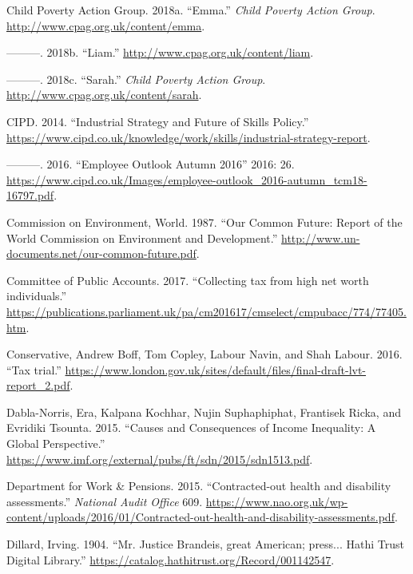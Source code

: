 \documentclass[]{tufte-handout}
\begin{document}
\leavevmode\hypertarget{ref-ChildPovertyActionGroupb}{}%
Child Poverty Action Group. 2018a. ``Emma.'' \emph{Child Poverty Action
Group}. \url{http://www.cpag.org.uk/content/emma}.

\leavevmode\hypertarget{ref-ChildPovertyActionGroupa}{}%
---------. 2018b. ``Liam.'' \url{http://www.cpag.org.uk/content/liam}.

\leavevmode\hypertarget{ref-ChildPovertyActionGroup}{}%
---------. 2018c. ``Sarah.'' \emph{Child Poverty Action Group}.
\url{http://www.cpag.org.uk/content/sarah}.

\leavevmode\hypertarget{ref-CIPD2014}{}%
CIPD. 2014. ``Industrial Strategy and Future of Skills Policy.''
\url{https://www.cipd.co.uk/knowledge/work/skills/industrial-strategy-report}.

\leavevmode\hypertarget{ref-CIPD2016}{}%
---------. 2016. ``Employee Outlook Autumn 2016'' 2016: 26.
\url{https://www.cipd.co.uk/Images/employee-outlook_2016-autumn_tcm18-16797.pdf}.

\leavevmode\hypertarget{ref-CommissiononEnvironment}{}%
Commission on Environment, World. 1987. ``Our Common Future: Report of
the World Commission on Environment and Development.''
\url{http://www.un-documents.net/our-common-future.pdf}.

\leavevmode\hypertarget{ref-HoC2017}{}%
Committee of Public Accounts. 2017. ``Collecting tax from high net worth
individuals.''
\url{https://publications.parliament.uk/pa/cm201617/cmselect/cmpubacc/774/77405.htm}.

\leavevmode\hypertarget{ref-Conservative2016}{}%
Conservative, Andrew Boff, Tom Copley, Labour Navin, and Shah Labour.
2016. ``Tax trial.''
\url{https://www.london.gov.uk/sites/default/files/final-draft-lvt-report_2.pdf}.

\leavevmode\hypertarget{ref-Dabla-Norris2015}{}%
Dabla-Norris, Era, Kalpana Kochhar, Nujin Suphaphiphat, Frantisek Ricka,
and Evridiki Tsounta. 2015. ``Causes and Consequences of Income
Inequality: A Global Perspective.''
\url{https://www.imf.org/external/pubs/ft/sdn/2015/sdn1513.pdf}.

\leavevmode\hypertarget{ref-DeptForWorkAndPensions2015}{}%
Department for Work \& Pensions. 2015. ``Contracted-out health and
disability assessments.'' \emph{National Audit Office} 609.
\url{https://www.nao.org.uk/wp-content/uploads/2016/01/Contracted-out-health-and-disability-assessments.pdf}.

\leavevmode\hypertarget{ref-Dillard1904}{}%
Dillard, Irving. 1904. ``Mr. Justice Brandeis, great American; press...
\textbar{} Hathi Trust Digital Library.''
\url{https://catalog.hathitrust.org/Record/001142547}.
\end{document}
